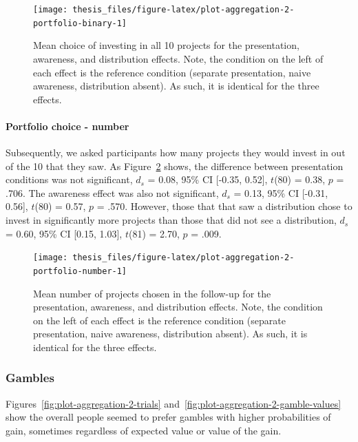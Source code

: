 \documentclass[a4paper, nobind, dvipsnames]{templates/ociamthesis}
\theoremstyle{definition}
\theoremstyle{definition}
\theoremstyle{definition}
\theoremstyle{definition}
\theoremstyle{remark}
\begin{document}
\begin{figure}
\texttt{[image: thesis\_files/figure-latex/plot-aggregation-2-portfolio-binary-1]} \caption{Mean choice of investing in all 10 projects for the presentation, awareness, and distribution effects. Note, the condition on the left of each effect is the reference condition (separate presentation, naive awareness, distribution absent). As such, it is identical for the three effects.}\label{fig:plot-aggregation-2-portfolio-binary}
\end{figure}

\paragraph{Portfolio choice - number}

Subsequently, we asked participants how many projects they would invest in out
of the 10 that they saw. As
Figure~\ref{fig:plot-aggregation-2-portfolio-number} shows, the difference
between presentation conditions was not significant,
\(d_s\) = 0.08, 95\% CI {[}-0.35, 0.52{]}, \(t\)(80) = 0.38, \(p\) = .706. The awareness effect
was also not significant, \(d_s\) = 0.13, 95\% CI {[}-0.31, 0.56{]}, \(t\)(80) = 0.57, \(p\) = .570.
However, those that that saw a distribution chose to invest in significantly
more projects than those that did not see a distribution,
\(d_s\) = 0.60, 95\% CI {[}0.15, 1.03{]}, \(t\)(81) = 2.70, \(p\) = .009.



\begin{figure}
\texttt{[image: thesis\_files/figure-latex/plot-aggregation-2-portfolio-number-1]} \caption{Mean number of projects chosen in the follow-up for the presentation, awareness, and distribution effects. Note, the condition on the left of each effect is the reference condition (separate presentation, naive awareness, distribution absent). As such, it is identical for the three effects.}\label{fig:plot-aggregation-2-portfolio-number}
\end{figure}

\subsubsection{Gambles}

Figures~\ref{fig:plot-aggregation-2-trials}
and~\ref{fig:plot-aggregation-2-gamble-values} show the overall people seemed
to prefer gambles with higher probabilities of gain, sometimes regardless of
expected value or value of the gain.
\end{document}
